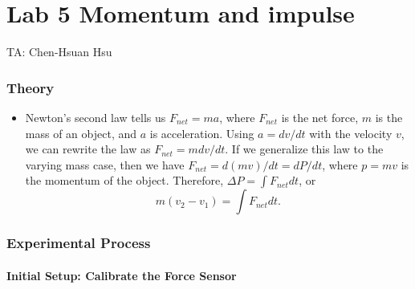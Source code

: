 \documentclass{article}
\begin{document}
\part*{Lab 5 Momentum and impulse}
TA: Chen-Hsuan Hsu\\
\vspace{-0.3in}

\section*{Theory}
\begin{itemize}
\item Newton's second law tells us $F_{net}=ma$, where $F_{net}$ is the net force, $m$ is the mass of an object, and $a$ is acceleration. Using $a=dv/dt$ with the velocity $v$, we can rewrite the law as $F_{net}=mdv/dt$. If we generalize this law to the varying mass case, then we have $F_{net}=d(mv)/dt=dP/dt$, where $p=mv$ is the momentum of the object. Therefore,
$\Delta P = \int F_{net} dt$, or
\begin{equation} \label{eq}
m (v_2-v_1) = \int F_{net} dt.
\end{equation}

\end{itemize}


\section*{Experimental Process}
\subsection*{Initial Setup: Calibrate the Force Sensor}
\end{document}

